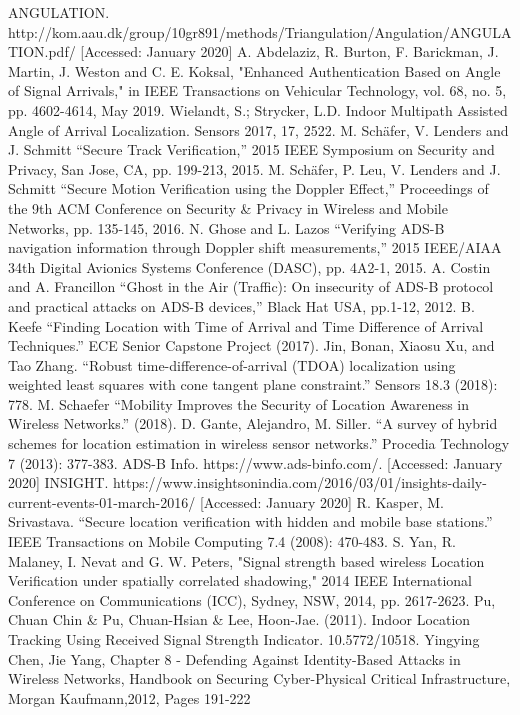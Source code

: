 \documentclass[conference]{IEEEtran}
\begin{document}
\begin{thebibliography}{00}

 ANGULATION. http://kom.aau.dk/group/10gr891/methods/Triangulation/Angulation/ANGULATION.pdf/ [Accessed: January 2020]
 A. Abdelaziz, R. Burton, F. Barickman, J. Martin, J. Weston and C. E. Koksal, "Enhanced Authentication Based on Angle of Signal Arrivals," in IEEE Transactions on Vehicular Technology, vol. 68, no. 5, pp. 4602-4614, May 2019.
 Wielandt, S.; Strycker, L.D. Indoor Multipath Assisted Angle of Arrival Localization. Sensors 2017, 17, 2522.
 M. Schäfer, V. Lenders and J. Schmitt ``Secure Track Verification,'' 2015 IEEE Symposium on Security and Privacy, San Jose, CA, pp. 199-213, 2015.
 M. Schäfer, P. Leu, V. Lenders and J. Schmitt ``Secure Motion Verification using the Doppler Effect,'' Proceedings of the 9th ACM Conference on Security \& Privacy in Wireless and Mobile Networks, pp. 135-145, 2016.
 N. Ghose and L. Lazos ``Verifying ADS-B navigation information through Doppler shift measurements,'' 2015 IEEE/AIAA 34th Digital Avionics Systems Conference (DASC), pp. 4A2-1, 2015.
 A. Costin and A. Francillon ``Ghost in the Air (Traffic): On insecurity of ADS-B protocol and practical attacks on ADS-B devices,'' Black Hat USA, pp.1-12, 2012.
B. Keefe ``Finding Location with Time of Arrival and Time Difference of Arrival Techniques.'' ECE Senior Capstone Project (2017).
Jin, Bonan, Xiaosu Xu, and Tao Zhang. ``Robust time-difference-of-arrival (TDOA) localization using weighted least squares with cone tangent plane constraint.'' Sensors 18.3 (2018): 778.
M. Schaefer ``Mobility Improves the Security of Location Awareness in Wireless Networks.'' (2018).
D. Gante, Alejandro, M. Siller. ``A survey of hybrid schemes for location estimation in wireless sensor networks.'' Procedia Technology 7 (2013): 377-383.
ADS-B Info. https://www.ads-binfo.com/. [Accessed: January 2020]
INSIGHT. https://www.insightsonindia.com/2016/03/01/insights-daily-current-events-01-march-2016/ [Accessed: January 2020]
R. Kasper, M. Srivastava. ``Secure location verification with hidden and mobile base stations.'' IEEE Transactions on Mobile Computing 7.4 (2008): 470-483.
 S. Yan, R. Malaney, I. Nevat and G. W. Peters, "Signal strength based wireless Location Verification under spatially correlated shadowing," 2014 IEEE International Conference on Communications (ICC), Sydney, NSW, 2014, pp. 2617-2623.
 Pu, Chuan Chin \& Pu, Chuan-Hsian \& Lee, Hoon-Jae. (2011). Indoor Location Tracking Using Received Signal Strength Indicator. 10.5772/10518. 
 Yingying Chen, Jie Yang, Chapter 8 - Defending Against Identity-Based Attacks in Wireless Networks, Handbook on Securing Cyber-Physical Critical Infrastructure, Morgan Kaufmann,2012, Pages 191-222

\end{thebibliography}
\end{document}
